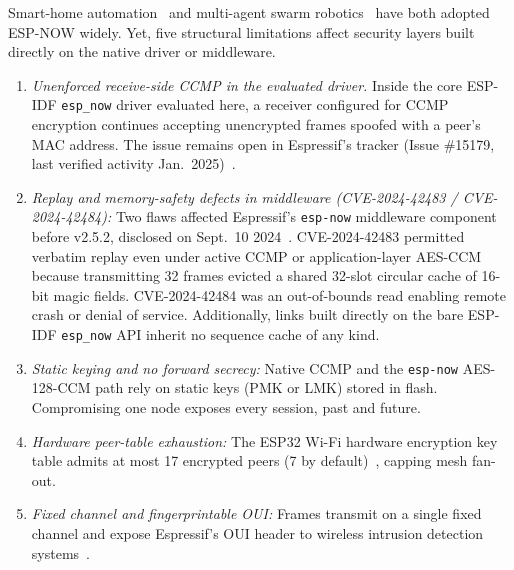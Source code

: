 \documentclass[conference]{IEEEtran}
\begin{document}
Smart-home automation~\cite{cujilema2023} and multi-agent swarm robotics~\cite{caniago2026} have both adopted ESP-NOW widely. Yet, five structural limitations affect security layers built directly on the native driver or middleware.
\begin{enumerate}
\setlength{\itemsep}{0pt}\setlength{\parskip}{0pt}
\item \textit{Unenforced receive-side CCMP in the evaluated driver.} Inside the core ESP-IDF \texttt{esp\_now} driver evaluated here, a receiver configured for CCMP encryption continues accepting unencrypted frames spoofed with a peer's MAC address. The issue remains open in Espressif's tracker (Issue \#15179, last verified activity Jan.\ 2025)~\cite{espressif_issue15179}.
\item \textit{Replay and memory-safety defects in middleware (CVE-2024-42483 / CVE-2024-42484):} Two flaws affected Espressif's \texttt{esp-now} middleware component before v2.5.2, disclosed on Sept.\ 10 2024~\cite{nozomi2024,nvd_cve42483}. CVE-2024-42483 permitted verbatim replay even under active CCMP or application-layer AES-CCM because transmitting 32 frames evicted a shared 32-slot circular cache of 16-bit magic fields. CVE-2024-42484 was an out-of-bounds read enabling remote crash or denial of service. Additionally, links built directly on the bare ESP-IDF \texttt{esp\_now} API inherit no sequence cache of any kind.
\item \textit{Static keying and no forward secrecy:} Native CCMP and the \texttt{esp-now} AES-128-CCM path rely on static keys (PMK or LMK) stored in flash. Compromising one node exposes every session, past and future.
\item \textit{Hardware peer-table exhaustion:} The ESP32 Wi-Fi hardware encryption key table admits at most 17 encrypted peers (7 by default)~\cite{espressif_espnow}, capping mesh fan-out.
\item \textit{Fixed channel and fingerprintable OUI:} Frames transmit on a single fixed channel and expose Espressif's OUI header to wireless intrusion detection systems~\cite{guardianair2024}.
\end{enumerate}
\end{document}

